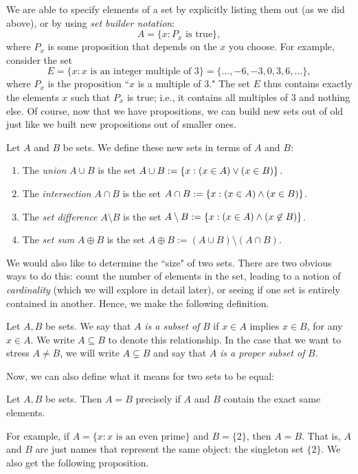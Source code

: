 \documentclass{article}
\begin{document}
We are able to specify elements of a set by explicitly listing them out (as we did above), or by using \textit{set builder notation}:
$$A = \{x: P_x \textrm{ is true}\},$$
where $P_x$ is some proposition that depends on the $x$ you choose. For example, consider the set
$$E = \{x: x \textrm{ is an integer multiple of }3\} = \{..., -6, -3, 0, 3, 6,...\},$$
where $P_x$ is the proposition ``$x$ is a multiple of $3$." The set $E$ thus contains exactly the elements $x$ such that $P_x$ is true; i.e., it contains all multiples of $3$ and nothing else. Of course, now that we have propositions, we can build new sets out of old just like we built new propositions out of smaller ones.
\begin{definition}
Let $A$ and $B$ be sets. We define these new sets in terms of $A$ and $B$:
\begin{enumerate}
    \item The \textit{union} $A\cup B$ is the set $A\cup B := \left\{x: (x\in A) \lor (x\in B)\right\}.$
    \item The \textit{intersection} $A\cap B$ is the set $A\cap B := \left\{x: (x\in A)\land (x\in B)\right\}$.
    \item The \textit{set difference} $A\setminus B$ is the set $A\setminus B := \left\{x: (x\in A)\land (x\not \in B)\right\}$.
    \item The \textit{set sum} $A\oplus B$ is the set $A\oplus B := (A\cup B) \setminus (A\cap B)$.
\end{enumerate}
\end{definition}
We would also like to determine the ``size" of two sets. There are two obvious ways to do this: count the number of elements in the set, leading to a notion of \textit{cardinality} (which we will explore in detail later), or seeing if one set is entirely contained in another. Hence, we make the following definition.
\begin{definition}
Let $A, B$ be sets. We say that $A$ \textit{is a subset of} $B$ if $x\in A$ implies $x\in B$, for any $x\in A$. We write $A\subseteq B$ to denote this relationship. In the case that we want to stress $A\neq B$, we will write $A\subsetneq B$ and say that $A$ \textit{is a proper subset of} $B$.
\end{definition}
Now, we can also define what it means for two sets to be equal:
\begin{definition}
Let $A,B$ be sets. Then $A = B$ precisely if $A$ and $B$ contain the exact same elements.
\end{definition}
For example, if $A = \{x: x \text{ is an even prime}\}$ and $B = \{2\}$, then $A = B$. That is, $A$ and $B$ are just names that represent the same object: the singleton set $\{2\}$. We also get the following proposition.
\end{document}
